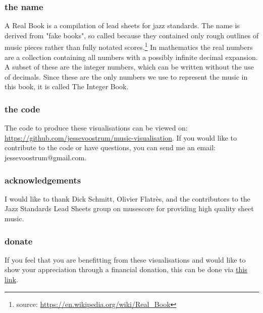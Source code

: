 \subsubsection*{the name}
A Real Book is a compilation of lead sheets for jazz standards. The name is derived from "fake books", so called because they contained only rough outlines of music pieces rather than fully notated scores.\footnote{source: \url{https://en.wikipedia.org/wiki/Real_Book}} In mathematics the real numbers are a collection containing all numbers with a possibly infinite decimal expansion. A subset of these are the integer numbers, which can be written without the use of decimals. Since these are the only numbers we use to represent the music in this book, it is called The Integer Book.

\subsubsection*{the code}
The code to produce these visualisations can be viewed on: \url{https://github.com/jessevoostrum/music-visualisation}. If you would like to contribute to the code or have questions, you can send me an email: jessevoostrum@gmail.com.

\subsubsection*{acknowledgements}
I would like to thank Dick Schmitt, Olivier Flatrès, and the contributors to the Jazz Standards Lead Sheets group on musescore for providing high quality sheet music. 

\subsubsection*{donate}
If you feel that you are benefitting from these visualisations and would like to show your appreciation through a financial donation, this can be done via \href{https://www.paypal.com/cgi-bin/webscr?cmd=_donations&business=jessevoostrum@gmail.com&no_shipping=1&no_note=1&tax=0&currency_code=EUR&lc=US&bn=PP_DonationsBF}{\underline{this link}}. 

